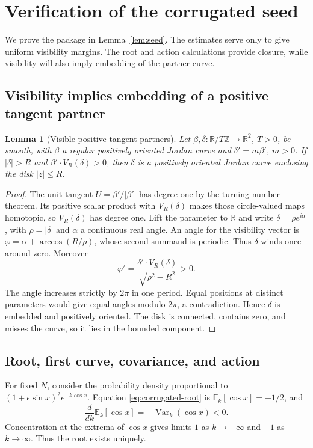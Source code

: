 \documentclass[11pt]{amsart}
\newtheorem{lemma}[theorem]{Lemma}
\theoremstyle{definition}
\theoremstyle{remark}
\newcommand{\R}{\mathbb R}\newcommand{\Sph}{\mathbb S}
\numberwithin{equation}{section}
\begin{document}
\section{Verification of the corrugated seed}\label{app:seed-estimates}
We prove the package in Lemma~\ref{lem:seed}. The estimates serve only
to give uniform visibility margins. The root and action calculations
provide closure, while visibility will also imply embedding of the
partner curve.

\subsection{Visibility implies embedding of a positive tangent partner}
\begin{lemma}[Visible positive tangent partners]\label{lem:visible-partner}
Let $\beta,\delta:\R/T\mathbb Z\to\R^2$, $T>0$, be smooth, with
$\beta$ a regular positively oriented Jordan curve and
$\delta'=m\beta'$, $m>0$. If $|\delta|>R$
and $\beta'\cdot V_R(\delta)>0$, then $\delta$ is a positively oriented
Jordan curve enclosing the disk $|z|\le R$.
\end{lemma}
\begin{proof}
The unit tangent $U=\beta'/|\beta'|$ has degree one by the turning-number
theorem. Its positive scalar product with $V_R(\delta)$ makes those
circle-valued maps homotopic, so $V_R(\delta)$ has degree one.
Lift the parameter to $\R$ and write $\delta=\rho e^{i\alpha}$, with
$\rho=|\delta|$ and $\alpha$ a continuous real angle. An angle for the
visibility vector is $\varphi=\alpha+\arccos(R/\rho)$, whose second
summand is periodic. Thus $\delta$ winds once around zero. Moreover
\begin{equation}\label{eq:visibility-embedding}
 \varphi'=\frac{\delta'\cdot V_R(\delta)}{\sqrt{\rho^2-R^2}}>0.
\end{equation}
The angle increases strictly by $2\pi$ in one period. Equal positions at
distinct parameters would give equal angles modulo $2\pi$, a contradiction.
Hence $\delta$ is embedded and positively oriented. The disk is connected,
contains zero, and misses the curve, so it lies in the bounded component.
\end{proof}

\subsection{Root, first curve, covariance, and action}
For fixed $N$, consider the probability density proportional to
$(1+\epsilon\sin x)^2e^{-k\cos x}$. Equation
\eqref{eq:corrugated-root} is $\mathbb E_k[\cos x]=-1/2$, and
\[
 \frac d{dk}\mathbb E_k[\cos x]=-\operatorname{Var}_k(\cos x)<0.
\]
Concentration at the extrema of $\cos x$ gives limits $1$ as
$k\to-\infty$ and $-1$ as $k\to\infty$. Thus the root exists uniquely.
\end{document}

